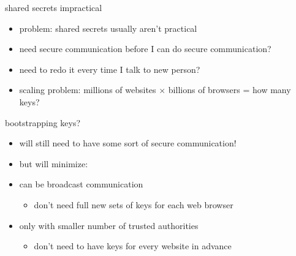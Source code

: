 \begin{frame}[fragile,label=sharedSecretProblem]{shared secrets impractical}
    \begin{itemize}
    \item problem: shared secrets usually aren't practical
    \vspace{.5cm}
    \item need secure communication before I can do secure communication?
    \item need to redo it every time I talk to new person?
    \item scaling problem: millions of websites $\times$ billions of browsers = how many keys?
    \end{itemize}
\end{frame}

\begin{frame}{bootstrapping keys?}
    \begin{itemize}
    \item will still need to have some sort of secure communication!
    \item but will minimize:
    \vspace{.5cm}
    \item can be broadcast communication
        \begin{itemize}
        \item don't need full new sets of keys for each web browser
        \end{itemize}
    \item only with smaller number of trusted authorities
        \begin{itemize}
        \item don't need to have keys for every website in advance
        \end{itemize}
    \end{itemize}
\end{frame}
